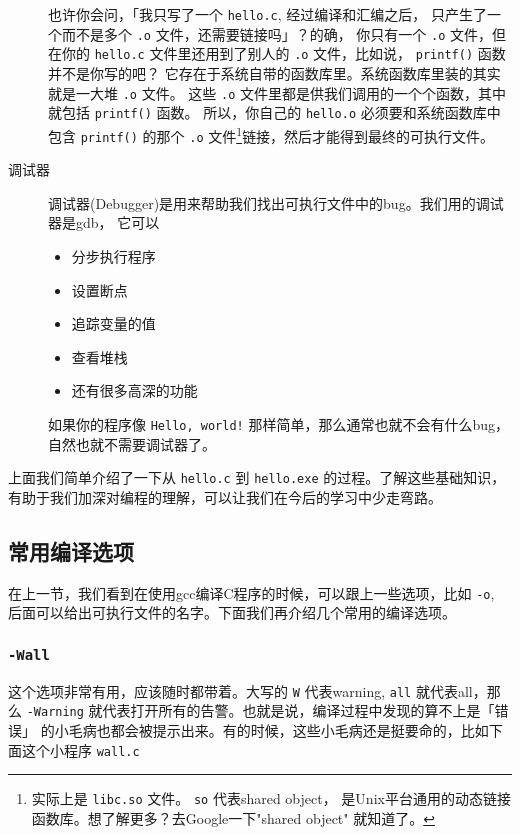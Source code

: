 \documentclass{wx672article}
\begin{document}
\begin{description}
也许你会问，「我只写了一个 \texttt{hello.c}, 经过编译和汇编之后，
只产生了一个而不是多个 \texttt{.o} 文件，还需要链接吗」？的确，
你只有一个 \texttt{.o} 文件，但在你的 \texttt{hello.c} 
文件里还用到了别人的 \texttt{.o} 文件，比如说， \texttt{printf()} 函数并不是你写的吧？
它存在于系统自带的函数库里。系统函数库里装的其实就是一大堆 \texttt{.o} 文件。
这些 \texttt{.o} 文件里都是供我们调用的一个个函数，其中就包括 \texttt{printf()} 函数。
所以，你自己的 \texttt{hello.o} 必须要和系统函数库中包含 \texttt{printf()} 的那个
\texttt{.o} 文件\footnote{实际上是 \texttt{libc.so} 文件。 \texttt{so} 代表shared object，
               是Unix平台通用的动态链接函数库。想了解更多？去Google一下"shared object"
               就知道了。}链接，然后才能得到最终的可执行文件。

\item[{调试器}] 调试器(Debugger)是用来帮助我们找出可执行文件中的bug。我们用的调试器是gdb，
它可以
\begin{itemize}
\item 分步执行程序
\item 设置断点
\item 追踪变量的值
\item 查看堆栈
\item 还有很多高深的功能
\end{itemize}
如果你的程序像 \texttt{Hello, world!} 那样简单，那么通常也就不会有什么bug，
自然也就不需要调试器了。
\end{description}

上面我们简单介绍了一下从 \texttt{hello.c} 到 \texttt{hello.exe} 的过程。了解这些基础知识，
有助于我们加深对编程的理解，可以让我们在今后的学习中少走弯路。

\subsection{常用编译选项}

在上一节，我们看到在使用gcc编译C程序的时候，可以跟上一些选项，比如 \texttt{-o},
后面可以给出可执行文件的名字。下面我们再介绍几个常用的编译选项。

\subsubsection{\texttt{-Wall}}
\label{sec-2-2-1}
这个选项非常有用，应该随时都带着。大写的 \texttt{W} 代表warning, \texttt{all} 就代表all，那么 \texttt{-Warning}
就代表打开所有的告警。也就是说，编译过程中发现的算不上是「错误」
的小毛病也都会被提示出来。有的时候，这些小毛病还是挺要命的，比如下面这个小程序 \texttt{wall.c}
\end{document}
